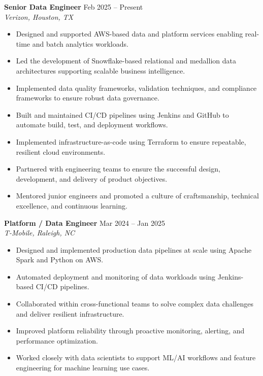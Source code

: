 \documentclass[10pt]{article} %
\begin{document}
\textbf{Senior Data Engineer} \hfill Feb 2025 -- Present \\
\textit{Verizon, Houston, TX}
\begin{itemize}[leftmargin=*, itemsep=3pt]
    \item Designed and supported AWS-based data and platform services enabling real-time and batch analytics workloads. %
    \item Led the development of Snowflake-based relational and medallion data architectures supporting scalable business intelligence.
    \item Implemented data quality frameworks, validation techniques, and compliance frameworks to ensure robust data governance.
    \item Built and maintained CI/CD pipelines using Jenkins and GitHub to automate build, test, and deployment workflows. %
    \item Implemented infrastructure-as-code using Terraform to ensure repeatable, resilient cloud environments. %
    \item Partnered with engineering teams to ensure the successful design, development, and delivery of product objectives. %
    \item Mentored junior engineers and promoted a culture of craftsmanship, technical excellence, and continuous learning. %
\end{itemize}

\textbf{Platform / Data Engineer} \hfill Mar 2024 -- Jan 2025 \\
\textit{T-Mobile, Raleigh, NC}
\begin{itemize}[leftmargin=*, itemsep=3pt]
    \item Designed and implemented production data pipelines at scale using Apache Spark and Python on AWS.
    \item Automated deployment and monitoring of data workloads using Jenkins-based CI/CD pipelines. %
    \item Collaborated within cross-functional teams to solve complex data challenges and deliver resilient infrastructure. %
    \item Improved platform reliability through proactive monitoring, alerting, and performance optimization. %
    \item Worked closely with data scientists to support ML/AI workflows and feature engineering for machine learning use cases.
\end{itemize}
\end{document}
